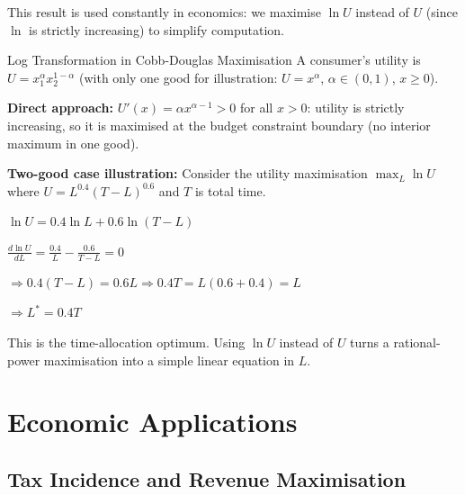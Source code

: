 \documentclass[12pt, a4paper]{article}
\theoremstyle{definition}
\begin{document}
This result is used constantly in economics: we maximise $\ln U$ instead of
$U$ (since $\ln$ is strictly increasing) to simplify computation.

\begin{exbox}{Log Transformation in Cobb-Douglas Maximisation}
A consumer's utility is $U = x_1^\alpha x_2^{1-\alpha}$ (with only one
good for illustration: $U = x^\alpha$, $\alpha \in (0,1)$, $x \geq 0$).

\textbf{Direct approach:} $U'(x) = \alpha x^{\alpha-1} > 0$ for all $x>0$:
utility is strictly increasing, so it is maximised at the budget constraint
boundary (no interior maximum in one good).

\textbf{Two-good case illustration:} Consider the utility maximisation
$\max_{L} \ln U$ where $U = L^{0.4}(T-L)^{0.6}$ and $T$ is total time.

$\ln U = 0.4\ln L + 0.6\ln(T-L)$

$\frac{d\ln U}{dL} = \frac{0.4}{L} - \frac{0.6}{T-L} = 0$

$\Rightarrow 0.4(T-L) = 0.6L \Rightarrow 0.4T = L(0.6+0.4) = L$

$\Rightarrow L^* = 0.4T$

This is the time-allocation optimum.  Using $\ln U$ instead of $U$ turns a
rational-power maximisation into a simple linear equation in $L$.
\end{exbox}

\section{Economic Applications}

\subsection{Tax Incidence and Revenue Maximisation}
\end{document}
